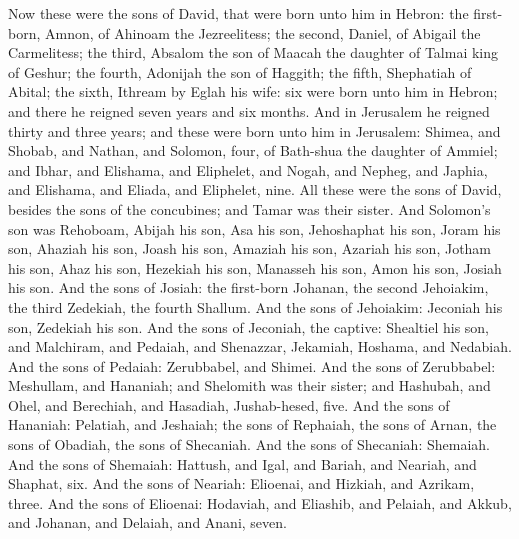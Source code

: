 Now these were the sons of David, that were born unto him in Hebron: the first-born, Amnon, of Ahinoam the Jezreelitess; the second, Daniel, of Abigail the Carmelitess; the third, Absalom the son of Maacah the daughter of Talmai king of Geshur; the fourth, Adonijah the son of Haggith; the fifth, Shephatiah of Abital; the sixth, Ithream by Eglah his wife: six were born unto him in Hebron; and there he reigned seven years and six months. And in Jerusalem he reigned thirty and three years; and these were born unto him in Jerusalem: Shimea, and Shobab, and Nathan, and Solomon, four, of Bath-shua the daughter of Ammiel; and Ibhar, and Elishama, and Eliphelet, and Nogah, and Nepheg, and Japhia, and Elishama, and Eliada, and Eliphelet, nine. All these were the sons of David, besides the sons of the concubines; and Tamar was their sister.  And Solomon’s son was Rehoboam, Abijah his son, Asa his son, Jehoshaphat his son, Joram his son, Ahaziah his son, Joash his son, Amaziah his son, Azariah his son, Jotham his son, Ahaz his son, Hezekiah his son, Manasseh his son, Amon his son, Josiah his son. And the sons of Josiah: the first-born Johanan, the second Jehoiakim, the third Zedekiah, the fourth Shallum. And the sons of Jehoiakim: Jeconiah his son, Zedekiah his son. And the sons of Jeconiah, the captive: Shealtiel his son, and Malchiram, and Pedaiah, and Shenazzar, Jekamiah, Hoshama, and Nedabiah. And the sons of Pedaiah: Zerubbabel, and Shimei. And the sons of Zerubbabel: Meshullam, and Hananiah; and Shelomith was their sister; and Hashubah, and Ohel, and Berechiah, and Hasadiah, Jushab-hesed, five. And the sons of Hananiah: Pelatiah, and Jeshaiah; the sons of Rephaiah, the sons of Arnan, the sons of Obadiah, the sons of Shecaniah. And the sons of Shecaniah: Shemaiah. And the sons of Shemaiah: Hattush, and Igal, and Bariah, and Neariah, and Shaphat, six. And the sons of Neariah: Elioenai, and Hizkiah, and Azrikam, three. And the sons of Elioenai: Hodaviah, and Eliashib, and Pelaiah, and Akkub, and Johanan, and Delaiah, and Anani, seven. 

